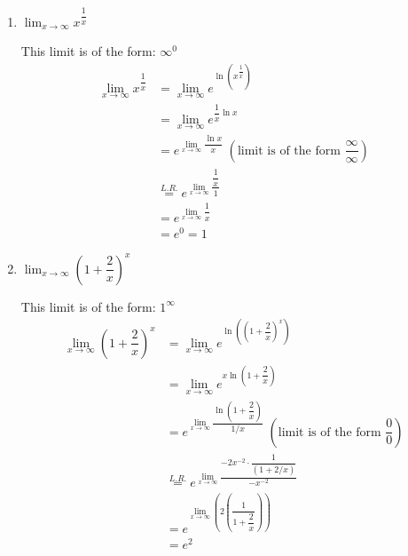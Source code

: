 \documentclass{ximera}
\begin{document}
\begin{problem}
\begin{enumerate}
    

  \item  $\displaystyle \lim_{x \to \infty} x^{\dfrac{1}{x}} $
    \begin{explanation}
    This limit is of the form: $\infty^0$
      \begin{align*}
        \displaystyle \lim_{x \to \infty} x^{\dfrac{1}{x}} &= \displaystyle \lim_{x \to \infty} e^{\ln \left( x^{\dfrac{1}{x}} \right) } \\
                                            &= \displaystyle \lim_{x \to \infty} e^{\dfrac{1}{x} \ln x } \\
                                            &= e^{ \displaystyle \lim_{x \to \infty} \dfrac{\ln x}{x} } \; \left( \text{limit is of the form } \dfrac{\infty}{\infty} \right) \\
                                            &\stackrel{L.R.}{=} e^{\displaystyle \lim_{x \to \infty}\dfrac{\dfrac{1}{x}}{1}} \\
                                            &= e^{\displaystyle \lim_{x \to \infty} \dfrac{1}{x}} \\
                                            &= e^0 = 1
      \end{align*}
    \end{explanation}
    \item $\displaystyle \lim_{x \to \infty} \left(1+\dfrac{2}{x}\right)^x$
        \begin{explanation}
    This limit is of the form: $1^\infty$
     \begin{align*}
        \displaystyle \lim_{x \to \infty} \left(1+\dfrac{2}{x}\right)^x &= \displaystyle \lim_{x \to \infty} e^{\ln \left(\left(1+\dfrac{2}{x}\right)^x \right) } \\
                                            &= \displaystyle \lim_{x \to \infty} e^{x \ln \left(1+\dfrac{2}{x}\right) } \\
                                            &= e^{ \displaystyle \lim_{x \to \infty} \dfrac{\ln \left(1+\dfrac{2}{x}\right)}{1/x} } \; \left( \text{limit is of the form } \dfrac{0}{0} \right) \\
                                            &\stackrel{L.R.}{=} e^{\displaystyle \lim_{x \to \infty}\dfrac{-2x^{-2}\cdot \dfrac{1}{(1+2/x)}}{-x^{-2}}} \\
                                            &= e^{\displaystyle \lim_{x \to \infty} \left(2\left(\dfrac{1}{1+\dfrac{2}{x}}\right)\right)} \\
                                            &= e^2 
        \end{align*}
    \end{explanation}
    

\end{enumerate}
\end{problem}
\end{document}
